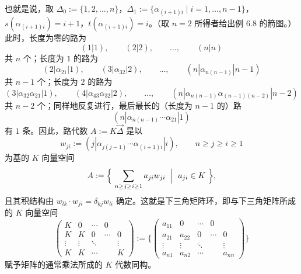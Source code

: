 也就是说，取 $\Delta_0:=\{1,2,\dots,n\}$，$\Delta_1:=\{\alpha_{(i+1)i}\mid i=1,\dots,n-1\}$，$s(\alpha_{(i+1)i})=i+1$，$t(\alpha_{(i+1)i})=i$。（取 $n=2$ 所得者给出例 6.8 的箭图。）此时，长度为零的路为
\[
(1|1),\qquad (2|2),\qquad \dots,\qquad (n|n)
\]
共 $n$ 个；长度为 $1$ 的路为
\[
(2|\alpha_{21}|1),\qquad (3|\alpha_{32}|2),\qquad \dots,\qquad (n|\alpha_{n(n-1)}|n-1)
\]
共 $n-1$ 个；长度为 $2$ 的路为
\[
(3|\alpha_{32}\alpha_{21}|1),\qquad (4|\alpha_{43}\alpha_{32}|2),\qquad \dots,\qquad (n|\alpha_{n(n-1)}\alpha_{(n-1)(n-2)}|n-2)
\]
共 $n-2$ 个；同样地反复进行，最后最长的（长度为 $n-1$ 的）路
\[
(n|\alpha_{n(n-1)}\cdots\alpha_{21}|1)
\]
有 $1$ 条。因此，路代数 $A:=K\vec{\Delta}$ 是以
\[
w_{ji}:=(j|\alpha_{j(j-1)}\cdots\alpha_{(i+1)i}|i),\qquad n\ge j\ge i\ge 1
\]
为基的 $K$ 向量空间
\[
A:=\Bigl\{\ \sum_{n\ge j\ge i\ge 1}a_{ji}w_{ji}\ \Bigm|\ a_{ji}\in K\ \Bigr\},
\]
且其积结构由 $w_{lk}\cdot w_{ji}=\delta_{kj}w_{li}$ 确定。这就是下三角矩阵环，即与下三角矩阵所成的 $K$ 向量空间
\[
\begin{pmatrix}
K & 0 & \cdots & 0\\
K & K & 0 & \cdots & 0\\
\vdots & \vdots & \ddots & & \vdots\\
K & K & \cdots & & K
\end{pmatrix}
:=
\Biggl\{
\begin{pmatrix}
a_{11} & 0 & \cdots & 0\\
a_{21} & a_{22} & 0 & \cdots & 0\\
\vdots & \vdots & \ddots & & \vdots\\
a_{n1} & a_{n2} & \cdots & & a_{nn}
\end{pmatrix}
\Biggr\}
\]
赋予矩阵的通常乘法所成的 $K$ 代数同构。

